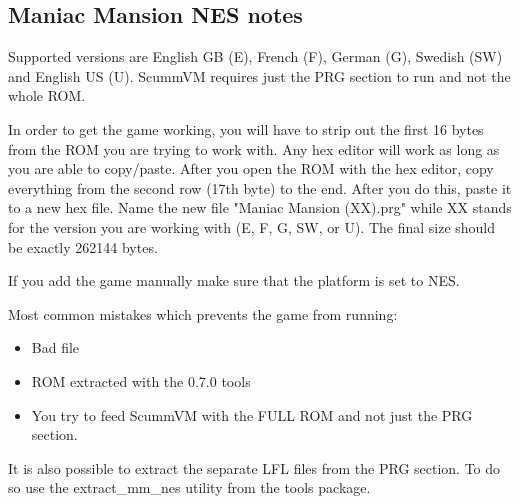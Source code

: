 


\subsection{Maniac Mansion NES notes}

Supported versions are English GB (E), French (F), German (G), Swedish (SW)
and English US (U).
ScummVM requires just the PRG section to run and not the whole ROM.

In order to get the game working, you will have to strip out the first
16 bytes from the ROM you are trying to work with. Any hex editor will work
as long as you are able to copy/paste.  After you open the ROM with the
hex editor, copy everything from the second row (17th byte) to the end.
After you do this, paste it to a new hex file. Name the new file
"Maniac Mansion (XX).prg" while XX stands for the version you are working
with (E, F, G, SW, or U).  The final size should be exactly 262144 bytes.

If you add the game manually make sure that the platform is set to NES.

Most common mistakes which prevents the game from running:

\begin{itemize}
  \item Bad file
  \item ROM extracted with the 0.7.0 tools
  \item You try to feed ScummVM with the FULL ROM and not just the PRG section.
\end{itemize}

It is also possible to extract the separate LFL files from the PRG section.
To do so use the extract\_mm\_nes utility from the tools package.
